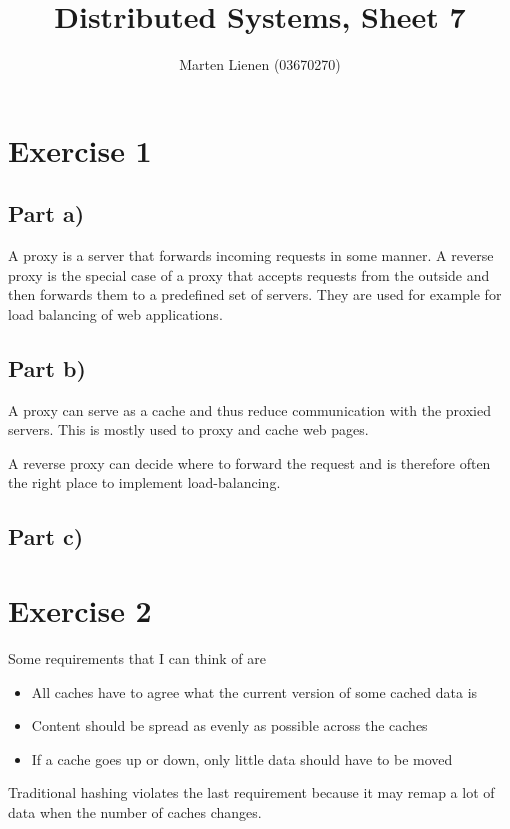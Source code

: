 \documentclass[10pt,a4paper]{article}
\title{Distributed Systems, Sheet 7}
\author{Marten Lienen (03670270)}
\begin{document}
\maketitle

\section*{Exercise 1}

\subsection*{Part a)}

A proxy is a server that forwards incoming requests in some manner.
A reverse proxy is the special case of a proxy that accepts requests from the outside and then forwards them to a predefined set of servers.
They are used for example for load balancing of web applications.

\subsection*{Part b)}

A proxy can serve as a cache and thus reduce communication with the proxied servers.
This is mostly used to proxy and cache web pages.

A reverse proxy can decide where to forward the request and is therefore often the right place to implement load-balancing.

\subsection*{Part c)}

\section*{Exercise 2}

Some requirements that I can think of are
\begin{itemize}
\item All caches have to agree what the current version of some cached data is
\item Content should be spread as evenly as possible across the caches
\item If a cache goes up or down, only little data should have to be moved
\end{itemize}

Traditional hashing violates the last requirement because it may remap a lot of data when the number of caches changes.
\end{document}
